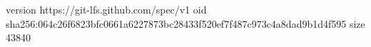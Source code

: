 version https://git-lfs.github.com/spec/v1
oid sha256:064c26f6823bfc0661a6227873bc28433f520ef7f487c973c4a8dad9b1d4f595
size 43840
